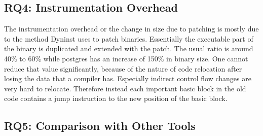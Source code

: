 
\subsection{RQ4: Instrumentation Overhead}
\label{section:typeshieldoverheadinstrumentation}


The instrumentation overhead or the change in size due to patching is mostly due to the method Dyninst uses to patch binaries. 
Essentially the executable part of the binary is duplicated and extended with the patch. The usual ratio is around 40\% to 
60\% while postgres has an increase of 150\% in binary size. One cannot reduce that value significantly, 
because of the nature of code relocation after losing the data that a compiler has. Especially indirect control flow 
changes are very hard to relocate. Therefore instead each important basic block in the old code contains a jump 
instruction to the new position of the basic block.

\subsection{RQ5: Comparison with Other Tools}
\label{RQ5: Is TypeShield better than other tools?}
\begin{table}[!h]
	\caption {The medians of calltargets per callsite for different tools.}
	\label{tbl:toolcompare}
\end{table}

